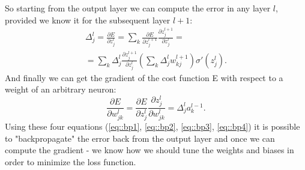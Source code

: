 So starting from the output layer we can compute the error in any layer $l$, provided we know it for the subsequent layer $l+1$:
\begin{equation}
\label{eq::bp3}
\begin{array}{lcl} 
\Delta^l_j=\frac{\partial E}{\partial z_j^l}=\sum_k \frac{\partial E}{\partial z^{l+1}_j}\frac{\partial z^{l+1}_j}{\partial z_j^l}=\\
=\sum_k \Delta^l_j \frac{\partial z^{l+1}_j}{\partial z_j^l} \left( \sum_k \Delta^l_j w^{l+1}_{kj}\right) \sigma'(z_j^l).
\end{array}
\end{equation}
And finally we can get the gradient of the cost function E with respect to a weight of an arbitrary neuron:
\begin{equation}
\label{eq::bp4}
\frac{\partial E}{\partial w_{jk}^l}=\frac{\partial E}{\partial z^l_j}\frac{\partial z_j^l}{\partial w_{jk}^l}=\Delta^l_j a_k^{l-1}.
\end{equation}
Using these four equations (\ref{eq::bp1}, \ref{eq::bp2}, \ref{eq::bp3}, \ref{eq::bp4}) it is possible to "backpropagate" the error back from the output layer and once we can compute the gradient - we know how we should tune the weights and biases in order to minimize the loss function.
